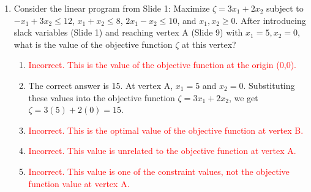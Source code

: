 \documentclass{article}%
\newcommand{\incorrect}[1]{\textcolor{red}{#1}}
\begin{document}
\begin{enumerate}
\begin{enumerate}
\begin{enumerate}%
\item The auxiliary problem is designed such that if a feasible solution to the original problem exists, the optimal value of the auxiliary problem's objective function $\xi$ will be 0.  This is because the auxiliary variable $x_0$ can be set to 0 in this case.  The solution obtained for the other variables at $\xi = 0$ provides a feasible starting point for solving the original problem using the simplex method.%
\item \incorrect{A value of 0 for $\text{max } \xi$ indicates feasibility, not infeasibility.}%
\item \incorrect{The value of 0 is not arbitrary. It has a specific meaning related to the feasibility of the original problem.}%
\item \incorrect{A value of 0 for $\text{max } \xi$ does not indicate unboundedness. Unboundedness is a different property of linear programs.}%
\item \incorrect{The auxiliary problem is designed to have a maximum objective function value of 0 if the original problem is feasible.}%
\end{enumerate}%
\vspace{0.5em}%
\end{enumerate}%
\item Consider the linear program from Slide 1: Maximize $ \zeta = 3x_1 + 2x_2 $ subject to $ -x_1 + 3x_2 \le 12 $, $ x_1 + x_2 \le 8 $, $ 2x_1 - x_2 \le 10 $, and $ x_1, x_2 \ge 0 $. After introducing slack variables (Slide 1) and reaching vertex A (Slide 9) with $ x_1 = 5, x_2 = 0 $, what is the value of the objective function $ \zeta $ at this vertex?%
\begin{enumerate}%
\item \incorrect{Incorrect. This is the value of the objective function at the origin (0,0).}%
\item The correct answer is 15. At vertex A, $ x_1 = 5 $ and $ x_2 = 0 $. Substituting these values into the objective function $ \zeta = 3x_1 + 2x_2 $, we get $ \zeta = 3(5) + 2(0) = 15 $.%
\item \incorrect{Incorrect. This is the optimal value of the objective function at vertex B.}%
\item \incorrect{Incorrect. This value is unrelated to the objective function at vertex A.}%
\item \incorrect{Incorrect. This value is one of the constraint values, not the objective function value at vertex A.}%

\end{enumerate}
\end{enumerate}
\end{document}
